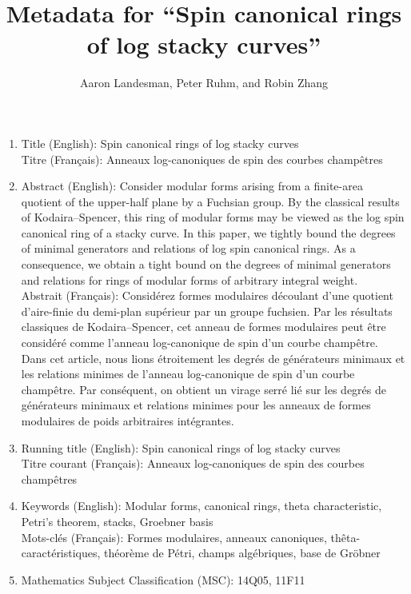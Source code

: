 \documentclass[10 pt]{amsart}
\title{Metadata for ``Spin canonical rings of log stacky curves''}
\author{Aaron Landesman, Peter Ruhm, and Robin Zhang}
\theoremstyle{plain}
\theoremstyle{definition}
\theoremstyle{remark}
\numberwithin{equation}{section}
\begin{document}
\maketitle

\begin{enumerate}
	\item Title (English): Spin canonical rings of log stacky curves \\
		Titre (Fran\c{c}ais): Anneaux log-canoniques de spin des
		courbes champ\^{e}tres
	\item Abstract (English): Consider modular forms arising from a
		finite-area quotient of the upper-half plane by a Fuchsian group.
		By the classical results of Kodaira--Spencer, this ring of
		modular forms may be viewed as the log spin canonical ring of a
		stacky curve. In this paper, we tightly bound the degrees of
		minimal generators and relations of log spin canonical rings.
		As a 	consequence, we obtain a tight bound on the degrees of
		minimal generators and relations for rings of modular forms of
		arbitrary integral weight. \\
		Abstrait (Fran\c{c}ais): Consid\'{e}rez formes modulaires
		d\'{e}coulant d'une quotient d'aire-finie du demi-plan
		sup\'{e}rieur par un groupe fuchsien. Par les r\'{e}sultats
		classiques de Kodaira--Spencer, cet anneau de formes modulaires
		peut \^{e}tre consid\'{e}r\'{e} comme l'anneau log-canonique de
		spin d'un courbe champ\^{e}tre. Dans cet article, nous
		lions \'{e}troitement les degr\'{e}s de g\'{e}n\'{e}rateurs
		minimaux et les relations minimes de l'anneau log-canonique de spin
		d'un courbe champ\^{e}tre. Par conséquent, on obtient
		un virage serr\'{e} li\'{e} sur les degr\'{e}s de
		g\'{e}n\'{e}rateurs minimaux et relations minimes pour les anneaux
		de formes modulaires de poids arbitraires int\'{e}grantes.
	\item Running title (English): Spin canonical rings of log stacky
		curves \\
		Titre courant (Fran\c{c}ais): Anneaux log-canoniques de spin des
		courbes champ\^{e}tres
	\item Keywords (English): Modular forms, canonical rings, theta
		characteristic, Petri's theorem, stacks, Groebner basis \\
		Mots-cl\'{e}s (Fran\c{c}ais): Formes modulaires, anneaux canoniques,
		th\^{e}ta-caract\'{e}ristiques, th\'{e}or\`{e}me de P\'{e}tri,
		champs alg\'{e}briques, base de Gr\"{o}bner
	\item Mathematics Subject Classification (MSC): 14Q05, 11F11
  \end{enumerate}
\end{document}
